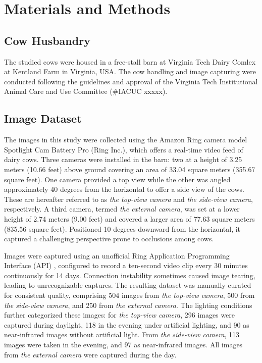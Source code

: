 \section{Materials and Methods}

\subsection*{Cow Husbandry}

The studied cows were housed in a free-stall barn at Virginia Tech Dairy Comlex at Kentland Farm in Virginia, USA. The cow handling and image capturing were conducted following the guidelines and approval of the Virginia Tech Institutional Animal Care and Use Committee (\#IACUC xxxxx).


\subsection*{Image Dataset}

The images in this study were collected using the Amazon Ring camera model Spotlight Cam Battery Pro (Ring Inc.), which offers a real-time video feed of dairy cows. Three cameras were installed in the barn: two at a height of 3.25 meters (10.66 feet) above ground covering an area of 33.04 square meters (355.67 square feet). One camera provided a top view while the other was angled approximately 40 degrees from the horizontal to offer a side view of the cows. These are hereafter referred to as \textit{the top-view camera} and \textit{the side-view camera}, respectively. A third camera, termed \textit{the external camera}, was set at a lower height of 2.74 meters (9.00 feet) and covered a larger area of 77.63 square meters (835.56 square feet). Positioned 10 degrees downward from the horizontal, it captured a challenging perspective prone to occlusions among cows.

Images were captured using an unofficial Ring Application Programming Interface (API) \citep{greif_dgreifring_2024}, configured to record a ten-second video clip every 30 minutes continuously for 14 days. Connection instability sometimes caused image tearing, leading to unrecognizable captures. The resulting dataset was manually curated for consistent quality, comprising 504 images from \textit{the top-view camera}, 500 from \textit{the side-view camera}, and 250 from \textit{the external camera}. The lighting conditions further categorized these images: for \textit{the top-view camera}, 296 images were captured during daylight, 118 in the evening under artificial lighting, and 90 as near-infrared images without artificial light. From \textit{the side-view camera}, 113 images were taken in the evening, and 97 as near-infrared images. All images from \textit{the external camera} were captured during the day.

